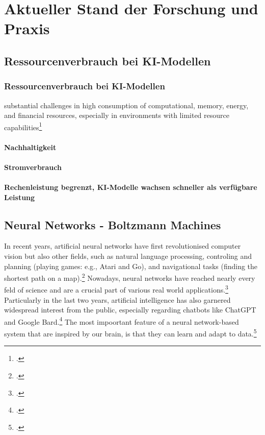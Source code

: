 \chapter{Aktueller Stand der Forschung und Praxis}

\section{Ressourcenverbrauch bei KI-Modellen}
\subsection{Ressourcenverbrauch bei KI-Modellen}

substantial challenges in high consumption of computational, memory, energy, and financial resources, especially in environments with limited resource capabilities\footcite[Vgl.][1-2]{baiEfficiencySystematicSurvey2024}

\subsubsection{Nachhaltigkeit}
\subsubsection{Stromverbrauch}
\subsubsection{Rechenleistung begrenzt, KI-Modelle wachsen schneller als verfügbare Leistung}

\section{Neural Networks - Boltzmann Machines}

In recent years, artificial neural networks have first revolutionised computer vision but also other fields, such as natural
language processing, controling and planning (playing games: e.g., Atari and Go), and navigational tasks (finding the shortest path on a map).\footcite[Vgl.][305]{cichyDeepNeuralNetworks2019}
Nowadays, neural networks have reached nearly every feld of science and are a crucial part of various real world applications.\footcite[Vgl.][1513]{gawlikowskiSurveyUncertaintyDeep2023}
Particularly in the last two years, artificial intelligence has also garnered widespread interest from the public, especially regarding chatbots like ChatGPT and Google Bard.\footcite[Vgl.][1-2]{singhChatGPTGoogle2023}  
The most impoortant feature of a neural network-based system that are inspired by our brain, is that they can learn and adapt to data.\footcite[Vgl.][305]{cichyDeepNeuralNetworks2019}

